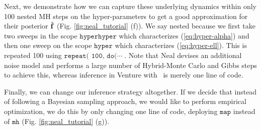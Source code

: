 Next, we demonstrate how we can capture these underlying dynamics within only
100  nested \ac{MH} steps on the hyper-parameters to get a good approximation
for their posterior $\hat{\mathbf{f}}$ (Fig. \ref{fig:neal_tutorial} (f)).
We say nested because we first take two sweeps in the scope
$\texttt{hyperhyper}$ which characterizes (\ref{eq:hyper-alpha}) and then one
sweep on the scope $\texttt{hyper}$ which characterizes (\ref{eq:hyper-ell}).
This is repeated 100 using $\texttt{repeat( 100, do(}\cdots\;$.
Note that Neal devises an additional noise model and performs a large number of Hybrid-Monte Carlo and Gibbs steps to achieve this, whereas inference in Venture with \gpmem\ is merely one line of code. 

Finally, we can change our inference strategy altogether. If we decide that instead of
following a Bayesian sampling approach, we would like to perform empirical optimization,
we do this by only changing one line of code, deploying $\texttt{map}$ instead
of $\texttt{mh}$ (Fig. \ref{fig:neal_tutorial} (g)). 

